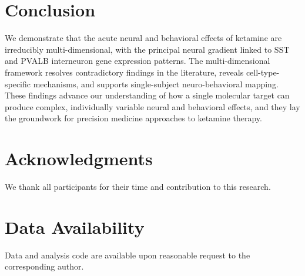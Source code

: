 \documentclass[12pt]{article}
\begin{document}
\section{Conclusion}

We demonstrate that the acute neural and behavioral effects of ketamine are irreducibly multi-dimensional, with the principal neural gradient linked to SST and PVALB interneuron gene expression patterns. The multi-dimensional framework resolves contradictory findings in the literature, reveals cell-type-specific mechanisms, and supports single-subject neuro-behavioral mapping. These findings advance our understanding of how a single molecular target can produce complex, individually variable neural and behavioral effects, and they lay the groundwork for precision medicine approaches to ketamine therapy.

\section*{Acknowledgments}
We thank all participants for their time and contribution to this research.

\section*{Data Availability}
Data and analysis code are available upon reasonable request to the corresponding author.



\end{document}
